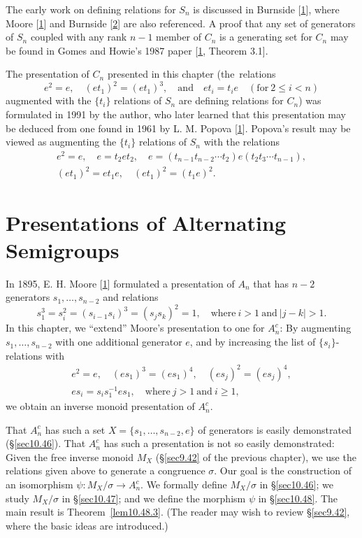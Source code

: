 \documentclass{surv-l}
\numberwithin{equation}{section}
\numberwithin{table}{section}
\numberwithin{figure}{section}
\theoremstyle{definition}
\begin{document}
The early work on defining relations for $S_{n}$ is discussed in
Burnside [\hyperlink{bib6}{1}], where Moore [\hyperlink{bib53}{1}] and Burnside
[\hyperlink{bib6b}{2}] are also referenced. A proof that
any set of generators of $S_{n}$ coupled with any rank $n-1$
member of $C_{n}$ is a generating set for $C_{n}$ may be found in
Gomes and Howie's 1987 paper [\hyperlink{bib22}{1},  Theorem 3.1].

The presentation of $C_{n}$ presented in this chapter
(the~relations
\[
e^{2}=e,\quad (et_{1})^{2}=(et_{1})^{3},\quad \mathrm{and}\quad et_{i}
=t_{i}e\quad (\mathrm{for}\ 2\leq i<n)
\]
augmented with the $\{t_{i}\}$ relations of $S_{n}$ are defining
relations for $C_{n}$) was formulated in 1991 by the author, who
later learned that this presentation may be deduced from one found
in 1961 by L. M. Popova
[\hyperlink{bib62}{1}]. Popova's result may be viewed as
augmenting the $\{t_{i}\}$ relations of $S_{n}$ with the relations
\begin{gather*}
e^{2}=e,\quad e=t_{2}et_{2},\quad e=(t_{n-1}t_{n-2}\cdots t_{2})e(t_{2}t_{3}\cdots t_{n-1}), \\
(et_{1})^{2}=et_{1}e,\quad (et_{1})^{2}=(t_{1}e)^{2}.
\end{gather*}

\chapter{Presentations of Alternating Semigroups}\label{chap10}

In 1895, E. H. Moore
[\hyperlink{bib53}{1}] formulated a presentation of
$A_{n}$ that has $n-2$ generators $s_{1},\ldots, s_{n-2}$ and
relations
\[
s_{1}^{3}=s_{i}^{2}=(s_{i-1}s_{i})^{3}=(s_{j}s_{k})^{2}=1,\quad \mathrm{where}\ i>1\ \mathrm{and}\ |j-k|>1.
\]
In this chapter, we ``extend'' Moore's presentation to one for
$A_{n}^{c}$: By augmenting $s_{1},\ldots,s_{n-2}$ with one
additional generator $e$, and by increasing the list of
$\{s_{i}\}$-relations with
\begin{gather*}
e^{2}=e,\quad (es_{1})^{3}=(es_{1})^{4},\quad (es_{j})^{2}=(es_{j})^{4}, \\
es_{i}=s_{i}s_{1}^{-1}es_{1},\quad \mathrm{where}\ j>1\ \mathrm{and}\ i\geq 1,
\end{gather*}
we obtain an inverse monoid presentation of $A_{n}^{c}$.

That $A_{n}^{c}$ has such a set $X =\{s_{1},\ldots, s_{n-2}, e\}$
of generators is easily demonstrated (\S\ref{sec10.46}). That
$A_{n}^{c}$ has such a presentation is not so easily demonstrated:
Given the free inverse monoid $M_{X}$ (\S\ref{sec9.42} of the
previous chapter), we use the relations given above to generate a
congruence $\sigma$. Our goal is the construction of an
isomorphism $\psi : M_{X}/\sigma\rightarrow A_{n}^{c}$. We
formally define $M_{X}/\sigma$ in \S\ref{sec10.46}; we study
$M_{X}/\sigma$ in \S\ref{sec10.47}; and we define the morphism
$\psi$ in \S\ref{sec10.48}. The main result is
Theorem~\ref{lem10.48.3}. (The reader may wish to review
\S\ref{sec9.42}, where the basic ideas are introduced.)
\end{document}
